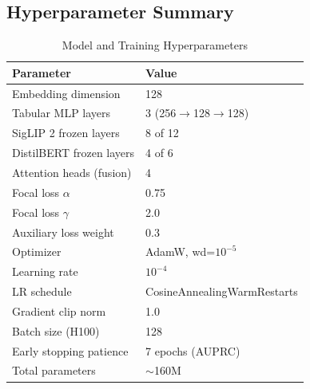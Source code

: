 \documentclass[10pt,conference,letterpaper]{IEEEtran}
\begin{document}
\begin{table}[H]
\caption{Hardware-Adaptive Hyperparameters}
\label{tab:hardware}
\begin{center}
\end{center}
\end{table}

\subsection{Hyperparameter Summary}

\begin{table}[H]
\caption{Model and Training Hyperparameters}
\label{tab:hyperparams}
\begin{center}
\begin{tabular}{ll}
\toprule
Parameter & Value \\
\midrule
Embedding dimension & 128 \\
Tabular MLP layers & 3 (256$\to$128$\to$128) \\
SigLIP 2 frozen layers & 8 of 12 \\
DistilBERT frozen layers & 4 of 6 \\
Attention heads (fusion) & 4 \\
Focal loss $\alpha$ & 0.75 \\
Focal loss $\gamma$ & 2.0 \\
Auxiliary loss weight & 0.3 \\
Optimizer & AdamW, wd=$10^{-5}$ \\
Learning rate & $10^{-4}$ \\
LR schedule & CosineAnnealingWarmRestarts \\
Gradient clip norm & 1.0 \\
Batch size (H100) & 128 \\
Early stopping patience & 7 epochs (AUPRC) \\
Total parameters & $\sim$160M \\
\bottomrule
\end{tabular}
\end{center}
\end{table}
\end{document}
